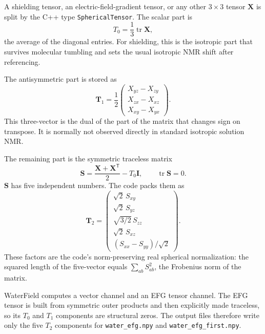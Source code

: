 \documentclass[11pt]{article}
\begin{document}
A shielding tensor, an electric-field-gradient tensor, or any other
\(3\times3\) tensor \(\bm X\) is split by the C++ type
\texttt{SphericalTensor}. The scalar part is
\begin{equation}
  T_0=\frac{1}{3}\operatorname{tr}\bm X ,
  \label{eq:t0}
\end{equation}
the average of the diagonal entries. For shielding, this is the isotropic part
that survives molecular tumbling and sets the usual isotropic NMR shift after
referencing.

The antisymmetric part is stored as
\begin{equation}
  \bm T_1=\frac{1}{2}
  \begin{pmatrix}
    X_{yz}-X_{zy}\\
    X_{zx}-X_{xz}\\
    X_{xy}-X_{yx}
  \end{pmatrix}.
  \label{eq:t1}
\end{equation}
This three-vector is the dual of the part of the matrix that changes sign on
transpose. It is normally not observed directly in standard isotropic solution
NMR.

The remaining part is the symmetric traceless matrix
\begin{equation}
  \bm S=\frac{\bm X+\bm X^{\mathsf T}}{2}-T_0\bm I,
  \qquad \operatorname{tr}\bm S=0 .
  \label{eq:s}
\end{equation}
\(\bm S\) has five independent numbers. The code packs them as
\begin{equation}
  \bm T_2 =
  \begin{pmatrix}
    \sqrt{2}\,S_{xy}\\
    \sqrt{2}\,S_{yz}\\
    \sqrt{3/2}\,S_{zz}\\
    \sqrt{2}\,S_{xz}\\
    (S_{xx}-S_{yy})/\sqrt{2}
  \end{pmatrix}.
  \label{eq:t2}
\end{equation}
These factors are the code's norm-preserving real spherical normalization:
the squared length of the five-vector equals
\(\sum_{ab}S_{ab}^2\), the Frobenius norm of the matrix.

WaterField computes a vector channel and an EFG tensor channel. The EFG tensor
is built from symmetric outer products and then explicitly made traceless, so
its \(T_0\) and \(T_1\) components are structural zeros. The output files
therefore write only the five \(T_2\) components for
\texttt{water\_efg.npy} and \texttt{water\_efg\_first.npy}.
\end{document}
